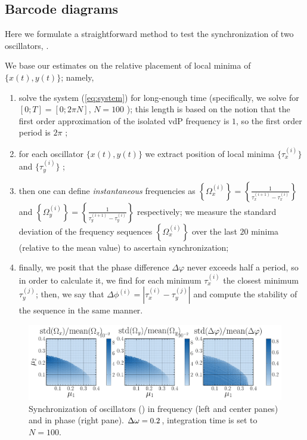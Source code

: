 \documentclass{mynotes}
\begin{document}
\subsection{Barcode diagrams}

Here we formulate a straightforward method to test the synchronization of two oscillators, . 

We base our estimates on the relative placement of local minima of \( \{ x(t), y(t) \} \); namely,
\begin{enumerate}[ topsep = -0.5em, itemsep = -0.25em ]
      \item[\color{rwth-blue}(i)] solve the system (\eqref{eq:system}) for long-enough time (specifically, we solve for \( [ 0; T ] = [ 0; 2 \pi N ]\), \( N = 100 \) ); this length is based on the notion that the first order approximation of the isolated vdP frequency is \( 1 \), so the first order period is \( 2 \pi \) ;
      \item[\color{rwth-blue}(ii)] for each oscillator \( \{ x(t), y(t) \} \) we extract position of local minima \( \{ \tau_x^{(i)} \}\) and \( \{ \tau_y^{(i)} \}\)  ;
      \item[\color{rwth-blue}(iii)] then one can define \textit{instantaneous} frequencies as \( \left\{ \Omega_x^{(i)} \right\} = \left\{ \frac{1}{ \tau_x^{(i+1)} - \tau_x^{(i)} } \right\} \) and \( \left\{ \Omega_y^{(i)} \right\} = \left\{ \frac{1}{ \tau_y^{(i+1)} - \tau_y^{(i)} } \right\} \) respectively; we measure the standard deviation of the frequency sequences \( \left\{ \Omega_x^{(i)} \right\} \) over the last \( 20 \) minima (relative to the mean value) to ascertain synchronization;
      \item[\color{rwth-blue}(iv)] finally, we posit that the phase difference \( \Delta\varphi \) never exceeds half a period, so in order to calculate it, we find for each minimum \( \tau_x^{(i)} \) the closest minimum \( \tau_y^{(j)} \); then, we say that \( \Delta\phi^{(i)} = \left| \tau_x^{(i)} - \tau_y^{(j)} \right| \) and compute the stability of the sequence in the same manner. 
\end{enumerate}
 
\begin{figure}[hbtp]
      \centering
      \includegraphics[width = 1.0\columnwidth]{figures/synch_heatmap.pdf}
      \caption{
            Synchronization of oscillators () in frequency (left and center panes) and in phase (right pane). \( \Delta\omega = 0.2 \), integration time is set to \( N = 100 \).
            \label{fig:synch_heatmap}
      }
\end{figure}
\end{document}
